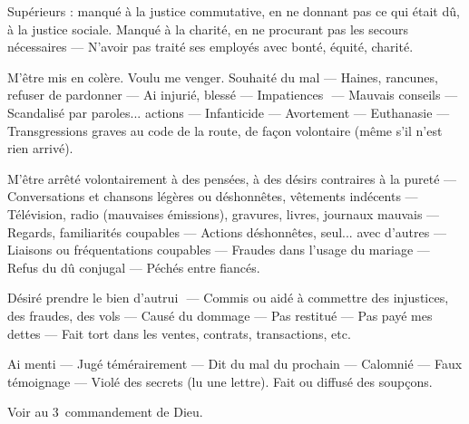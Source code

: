 Supérieurs : manqué à la justice commutative, en ne donnant pas ce qui était dû, à
la justice sociale. Manqué à la charité, en
ne procurant pas les secours nécessaires
— N’avoir pas traité ses employés avec
bonté, équité, charité.


M’être mis en colère. Voulu me venger.
Souhaité du mal — Haines, rancunes, refuser de pardonner — Ai injurié, blessé
— Impatiences ­ — Mauvais conseils —
Scandalisé par paroles... actions — Infanticide — Avortement — Euthanasie —
Transgressions graves au code de la route,
de façon volontaire (même s’il n’est rien
arrivé).


M’être arrêté volontairement à des pensées, à des désirs contraires à la pureté
— Conversations et chansons légères ou
déshonnêtes, vêtements indécents — Télévision, radio (mauvaises émissions),
gravures, livres, journaux mauvais — Regards, familiarités coupables — Actions
déshonnêtes, seul... avec d’autres —
Liaisons ou fréquentations coupables —
Fraudes dans l’usage du mariage — Refus
du dû conjugal — Péchés entre fiancés.


Désiré prendre le bien d’autrui ­ — Commis ou aidé à commettre des injustices,
des fraudes, des vols — Causé du dommage — Pas restitué — Pas payé mes dettes — Fait tort dans les ventes, contrats,
transactions, etc.


Ai menti — Jugé témérairement — Dit
du mal du prochain — Calomnié — Faux
témoignage — Violé des secrets (lu une
lettre). Fait ou diffusé des soupçons.




Voir au 3\ieme\ commandement de Dieu.


